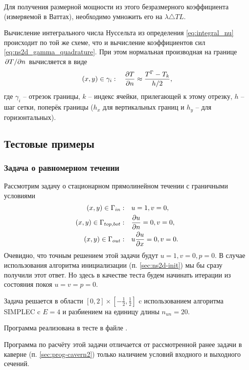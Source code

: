 Для получения размерной мощности из этого безразмерного коэффициента (измеряемой в Ваттах),
необходимо умножить его на $\lambda \triangle T L$.

Вычисление интегрального числа Нуссельта из определения \cref{eq:integral_nu} происходит по той
же схеме, что и вычисление коэффициентов сил \cref{eq:ns2d_gamma_quadrature}.
При этом нормальная производная на границе $\left.\partial T\middle/\partial n\right.$ вычисляется в виде
\begin{equation}
\label{eq:dtdn_scheme}
(x,y)\in\gamma_i: \quad \frac{\partial T}{\partial n} \approx \frac{T^\Gamma - T_k}{h/2},
\end{equation}
где $\gamma_i$ -- отрезок границы, $k$ -- индекс ячейки, прилегающей к этому отрезку,
$h$ -- шаг сетки, поперёк границы ($h_x$ для вертикальных границ и $h_y$ -- для горизонтальных).

\subsection{Тестовые примеры}

\subsubsection{Задача о равномерном течении}
Рассмотрим задачу о стационарном прямолинейном течении с граничными условиями
\begin{align*}
(x,y)\in\Gamma_{in}:      \quad & u=1, v=0, \\
(x,y)\in\Gamma_{top,bot}: \quad & \frac{\partial u}{\partial n} = 0, v = 0, \\
(x,y)\in\Gamma_{out}:     \quad & u\frac{\partial u}{\partial x} = 0, v = 0.
\end{align*}
Очевидно, что точным решением этой задачи будут $u=1, v=0, p=0$.
В случае использования алгоритма инициализации (п. \ref{sec:ns2d-init}) 
мы бы сразу получили этот ответ. Но здесь в качестве теста будем начинать итерации
из состояния покоя $u=v=p=0$.

Задача решается в области $[0, 2]\times[-\tfrac12, \tfrac12]$
c использованием алгоритма SIMPLEC c $E=4$ и разбиением на единицу длины $n_{un} = 20$.

Программа реализована в тесте  в файле .

Программа по расчёту этой задачи отличается от рассмотренной ранее задачи
в каверне (п. \ref{sec:prog-cavern2}) только наличием условий
входного и выходного сечений.

